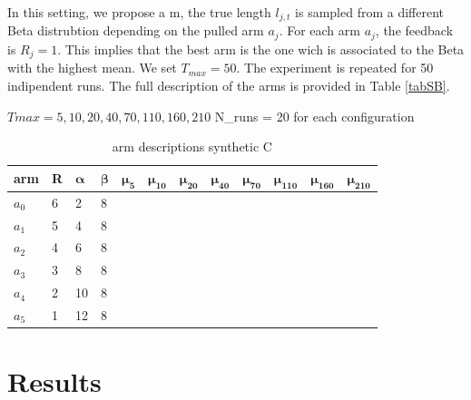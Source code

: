 In this setting, we propose a m, the true length $l_{j,t}$ is sampled from a different Beta distrubtion depending on the pulled arm $a_j$. For each arm $a_j$, the feedback is $R_j=1$. This implies that the best arm is the one wich is associated to the Beta with the highest mean. We set $T_{max}=50$. The experiment is repeated for 50 indipendent runs. The full description of the arms is provided in Table \ref{tabSB}.

$Tmax = 5, 10, 20, 40, 70, 110, 160, 210$
N\_runs = 20 for each configuration

\begin{table}[H]
	\centering
	\caption{arm descriptions synthetic C}
	\begin{tabular}{|l||l|l|l|l|l|l|l|l|l|l|l|} 
		\hline
		\textbf{arm} & \textbf{R} & $\boldsymbol{\alpha}$ & $\boldsymbol{\beta}$ & $\boldsymbol{\mu_5}$ & $\boldsymbol{\mu_{10}}$ & $\boldsymbol{\mu_{20}}$ & $\boldsymbol{\mu_{40}}$ & $\boldsymbol{\mu_{70}}$ & $\boldsymbol{\mu_{110}}$& $\boldsymbol{\mu_{160}}$& $\boldsymbol{\mu_{210}}$ \\ 
		\hline
		$a_0$     & 6          & 2        & 8       &    & & & & & & &                \\ 
		\hline
		$a_1$     & 5          & 4        & 8       &    & & & & & & &                   \\ 
		\hline
		$a_2$     & 4          & 6        & 8       &          & & & & & & &           \\ 
		\hline
		$a_3$     & 3          & 8        & 8       &                 & & & & & & &     \\ 
		\hline
		$a_4$     & 2          & 10        & 8       & & & & & & & &                  \\ 
		\hline
		${a_5}$     & 1          & 12        & 8       &      & & & & &  &&                \\                 
		\hline
	\end{tabular}
\end{table}

\section{Results}

